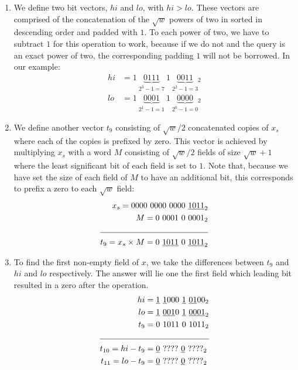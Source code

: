 \begin{enumerate}
    \item \label{blt:parallel1}
    We define two bit vectors, $hi$ and $lo$, with $hi > lo$. These vectors are comprised of the concatenation of the $\sqrt{w}$ powers of two in sorted in descending order and padded with $1$. To each power of two, we have to subtract $1$ for this operation to work, because if we do not and the query is an exact power of two, the corresponding padding $1$ will not be borrowed. In our example:
    \begin{align*}
        hi &= 1\ \underbrace{0111}_{2^3-1=7}\ 1\ \underbrace{0011}_{2^2-1=3}{}_2\\
        lo &= 1\ \underbrace{0001}_{2^1-1=1}\ 1\ \underbrace{0000}_{2^0-1=0}{}_2
    \end{align*}
    
    \item \label{blt:parallel2}
    We define another vector $t_9$ consisting of $\sqrt{w}/2$ concatenated copies of $x_s$ where each of the copies is prefixed by zero. This vector is achieved by multiplying $x_s$ with a word $M$ consisting of $\sqrt{w}/2$ fields of size $\sqrt{w} + 1$ where the least significant bit of each field is set to $1$. Note that, because we have set the size of each field of $M$ to have an additional bit, this corresponds to prefix a zero to each $\sqrt{w}$ field:
    \begin{align*}
        x_s = 0000\ 0000\ 0000\ &\underline{1011}_2\\ 
        M = 0\ 0001\ 0\ &0001_2\\ \cline{1-2}
        t_9 = x_s \times M = 0\ \underline{1011}\ 0\ &\underline{1011}_2
    \end{align*}
    
    \item \label{blt:parallel3}
    To find the first non-empty field of $x$, we take the differences between $t_9$ and $hi$ and $lo$ respectively. The answer will lie one the first field which leading bit resulted in a zero after the operation.
    \begin{align*}
                          hi &= \underline{1}\ \underline{1}000\ \underline{1}\ \underline{01}00_2\\
                          lo &= \underline{1}\ \underline{001}0\ \underline{1}\ \underline{0001}_2 \\
                      t_9 &= 0\ 1011\ 0\ 1011_2\\ \cline{1-2}
        t_{10} = hi - t_9 &= \underline{0}\ ????\ \underline{0}\ ????_2 \\
        t_{11} = lo - t_9 &= \underline{0}\ ????\ \underline{0}\ ????_2
    \end{align*}
    

\end{enumerate}
